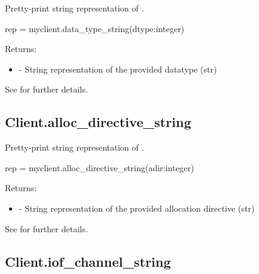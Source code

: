 \summary

Pretty-print string representation of .

\format

\pyspecificstart
\begin{codepar}
rep = myclient.data_type_string(dtype:integer)
\end{codepar}
\pyspecificend

\begin{arglist}
\end{arglist}

Returns:
\begin{itemize}
    \item {} - String representation of the provided datatype (str)
\end{itemize}

See  for further details.


\subsection{Client.alloc_directive_string}

\summary

Pretty-print string representation of .

\format

\pyspecificstart
\begin{codepar}
rep = myclient.alloc_directive_string(adir:integer)
\end{codepar}
\pyspecificend

\begin{arglist}
\end{arglist}

Returns:
\begin{itemize}
    \item {} - String representation of the provided allocation directive (str)
\end{itemize}

See  for further details.


\subsection{Client.iof_channel_string}

